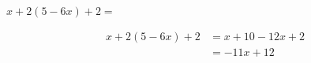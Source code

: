 $x + 2(5 - 6x) + 2 =$

\begin{solutionbox}{2.5cm}
    \begin{align*}
        x + 2(5 - 6x) + 2 & =x+10-12x+2 \\
                          & =-11x+12
    \end{align*}
\end{solutionbox}
